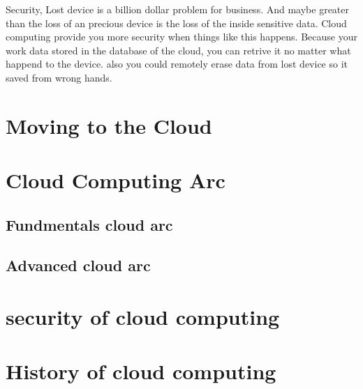 \documentclass [12pt]{book}
\begin{document}
	
	Security, Lost device is a billion dollar problem for business. And maybe greater than the loss of an precious device is the loss of the inside sensitive data. Cloud computing provide you more security when things like this happens. Because your work data stored in the database of the cloud, you can retrive it no matter what happend to the device. also you could remotely erase data from lost device so it saved from wrong hands.
	
	
	\chapter{Moving to the Cloud}
	\chapter{Cloud Computing Arc}
	\section{Fundmentals cloud arc}
    \section{Advanced cloud arc}
    \chapter{security of cloud computing}
    
    
    
    
    \chapter{History of cloud computing}
    
\end{document}
